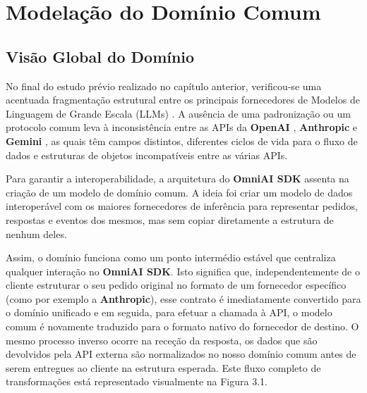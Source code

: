     \chapter{Modelação do Domínio Comum}

    \section{Visão Global do Domínio}

    No final do estudo prévio realizado no capítulo anterior, verificou-se uma acentuada fragmentação estrutural entre os principais fornecedores de Modelos de Linguagem de Grande Escala (LLMs) \cite{ibm_llm_topics}. A ausência de uma padronização ou um protocolo comum leva à inconsistência entre as APIs da \textbf{OpenAI} \cite{openai_api}, \textbf{Anthropic} \cite{anthropic_api} e \textbf{Gemini} \cite{google_gemini_api}, as quais têm campos distintos, diferentes ciclos de vida para o fluxo de dados e estruturas de objetos incompatíveis entre as várias APIs.

    Para garantir a interoperabilidade, a arquitetura do \textbf{OmniAI SDK} assenta na criação de um modelo de domínio comum. A ideia foi criar um modelo de dados interoperável com os maiores fornecedores de inferência para representar pedidos, respostas e eventos dos mesmos, mas sem copiar diretamente a estrutura de nenhum deles.

   Assim, o domínio funciona como um ponto intermédio estável que centraliza qualquer interação no \textbf{OmniAI SDK}. Isto significa que, independentemente de o cliente estruturar o seu pedido original no formato de um fornecedor específico (como por exemplo a \textbf{Anthropic}), esse contrato é imediatamente convertido para o domínio unificado e em seguida, para efetuar a chamada à API, o modelo comum é novamente traduzido para o formato nativo do fornecedor de destino. O mesmo processo inverso ocorre na receção da resposta, os dados que são devolvidos pela API externa são normalizados no nosso domínio comum antes de serem entregues ao cliente na estrutura esperada. Este fluxo completo de transformações está representado visualmente na Figura 3.1.
   
